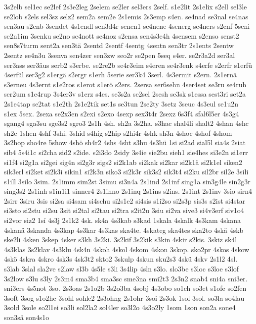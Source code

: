 {3s2elb
sel1ec
se2lef
2s3e2leg
2selem
se2ler
sel3ers
2self.
s1e2lit
2s1elix
s2ell
sel3le
se2lob
s2els
sel3sz
selz2
sem2a
sem2e
2s1emis
2s3emp
s4en.
se4nad
se3nal
se4nas
sen3au
s2enb
3sendet
4s1endl
sen3d4r
senen1
se4nene
4senerg
se4ners
s2enf
5seni
se2n1im
3senku
se2no
se4nott
se4noz
s2ensa
sen4s3e4h
4sensem
s2enso
senst2
sen8s7turm
sent2a
sen3tä
2sentd
2sentf
4sentg
4sentn
sen3tr
2s1ents
2sentw
2sentz
se4n3u
3senva
sen4zer
sen3zw
seo2r
se2pen
5seq
s4er.
se2r3a2d
ser3al
ser3ass
ser3äus
serb2
s3erbe.
se2re2b
se4r3eim
s4eren
se4r3enk
s4erfe
s2erfr
s1erfü
4serfül
ser3g2
s1ergä
s2ergr
s1erh
5serie
ser3k4
3serl.
4s3ermit
s2ern.
2s1ernä
s3erneu
4s3ernt
s1e2ros
s1erot
s1erö
s2ers.
2sersa
ser6sehn
4ser4set
se3ru
se4ruh
ser2um
s1e4rup
3s4er3v
s1erz
s4es.
se3s2a
se2sel
2sesh
se3sk
s1essa
sest3ri
set2a
2s1e4tap
se2tat
s1e2th
2s1e2tik
set1s
se3tun
2se2ty
3setz
3seuc
4s3eul
se1u2n
s1ex
5sex.
2sexa
se2x3en
s2exi
s2exo
4sexp
sex3t4r
2sexz
6s3f4
sfal6l5er
4s3g4
sgang4
sga3su
sge3s2
sgro3
2s1h
4sh.
sh2a
3s2ha.
s3hac
shal4li
shalt2
4shan
4shc
sh2e
1shen
4shf
3shi.
3shid
s4hig
s2hip
s2hi4r
4shk
sh3n
4shoc
4shof
4shom
3s2hop
sho4re
5show
4shö
sh4r2
4shs
4sht
s3hu
4s3hü
1si
si2ad
sial5l
sia4s
2siat
sib4
5s4i1c
si2cha
sid2
s2ide.
s2i3do
2sidy
3s4ie
sie2bu
sieh1
sie4hes
si3e2n
si1err
si1f4
si2g1a
si2gei
sig4n
si2g3r
sigs2
si2k1ab
si2kak
si2kar
si2k1ä
si2k1el
siken2
sik3erl
si2ket
si2k3i
sikin1
si2k3n
siko3
si2k3r
sik3s2
sik3t4
si2ku
sil2br
sil2e
3sili
s1ill
3silo
3sim.
2s1imm
sim2st
3simu
si3n4a
2s1ind
2s1inf
sing1a
sin3g4le
sin2g3r
sing3s2
2s1inh
s1in1i1
sinner4
2s1inno
2s1inq
2s1ins
s2ins.
2s1int
2s1inv
3sio
sirn4
2sirr
3siru
3sis
si2sa
si4sam
si4schu
si2s1e2
si4sis
s1i2so
si2s3p
sis3s
s2ist
si4star
si3sto
si2stu
si2su
3sit
si2tal
si2tau
si2tra
s2it2u
3siu
si2va
sive3
si4v3erf
siv1o4
si2vor
siz2
1sí
4s3j
2s1k2
4sk.
sk4a
4s3kab
s3kad
1skala
4skalk
4s3kam
4skana
4skanä
3skanda
4s3kap
4s3kar
4s3kas
ska4te.
4skateg
ska4tes
ska2to
4skä
4skb
ske2li
4sken
3skep
4sker
s3kh
3s2ki.
3s2kif
3s2kik
s3kin
4skir
s2kis.
3skiz
sk4l
4s3klas
3s2klav
4s3klu
4sk4n
4skoh
4skol
4skom
4skon
3skop.
sko2pr
4skos
4skow
4skö
4skra
4skro
4sk3s
4sk3t2
skto2
3skulp
4skun
sku2s3
4skü
4skv
2s1l2
4sl.
s3lab
3slal
sla2ve
s2law
sl3b
4s5le
s3li
3s4lip
4sln
s3lo.
slo3be
s3loc
s3loe
s3lof
3s2low
s3lu
s3ly
2s3m4
sma3b4
sma3sc
sme3na
smi2t3
2s3n2
snab4
sni4a
sni3er.
sni3ers
4s5not
3so.
2s3oas
2s1o2b
3s2o3ba
4sobj
4s3obo
so1ch
so3et
s1ofe
so2fen
3soft
3sog
s1o2he
3sohl
sohle2
2s3ohng
2s1ohr
3soi
2s3ok
1sol
3sol.
so3la
so4lau
3sold
3sole
so2l1ei
so3li
sol2la2
sol4ler
so3l2o
4s3o2ly
1som
1son
son2a
sone4
son3sä
son4s1o
}
